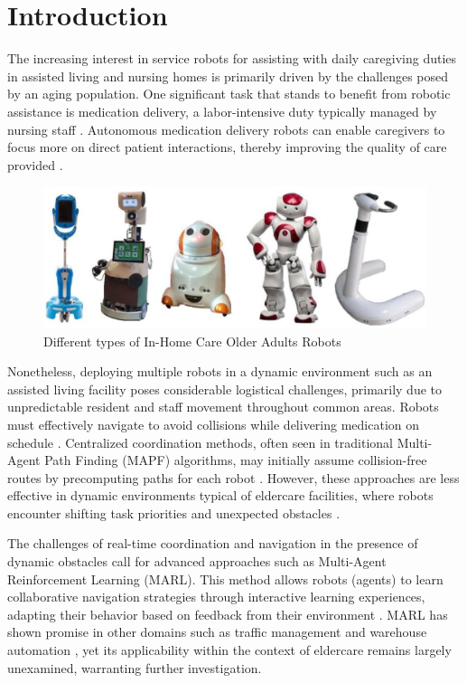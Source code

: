 \documentclass[conference]{IEEEtran}
\begin{document}
\section{Introduction}
The increasing interest in service robots for assisting with daily caregiving duties in assisted living and nursing homes is primarily driven by the challenges posed by an aging population. One significant task that stands to benefit from robotic assistance is medication delivery, a labor-intensive duty typically managed by nursing staff \citep{bao2021}. Autonomous medication delivery robots can enable caregivers to focus more on direct patient interactions, thereby improving the quality of care provided \citep{jeon2016}.

    \label{fig:placeholder}

\begin{figure}
    \centering
    \includegraphics[width=1\linewidth]{In-Home Care for Older Adults.png}
    \caption{Different types of In-Home Care  Older Adults Robots}
    \label{fig:inhome-care-robots}


 
\end{figure}   
Nonetheless, deploying multiple robots in a dynamic environment such as an assisted living facility poses considerable logistical challenges, primarily due to unpredictable resident and staff movement throughout common areas. Robots must effectively navigate to avoid collisions while delivering medication on schedule \citep{song2020}. Centralized coordination methods, often seen in traditional Multi-Agent Path Finding (MAPF) algorithms, may initially assume collision-free routes by precomputing paths for each robot \citep{wang2023}. However, these approaches are less effective in dynamic environments typical of eldercare facilities, where robots encounter shifting task priorities and unexpected obstacles \citep{sharon2015}.

The challenges of real-time coordination and navigation in the presence of dynamic obstacles call for advanced approaches such as Multi-Agent Reinforcement Learning (MARL). This method allows robots (agents) to learn collaborative navigation strategies through interactive learning experiences, adapting their behavior based on feedback from their environment \citep{liu2023}. MARL has shown promise in other domains such as traffic management and warehouse automation \citep{yu2023}, yet its applicability within the context of eldercare remains largely unexamined, warranting further investigation.
\end{document}
